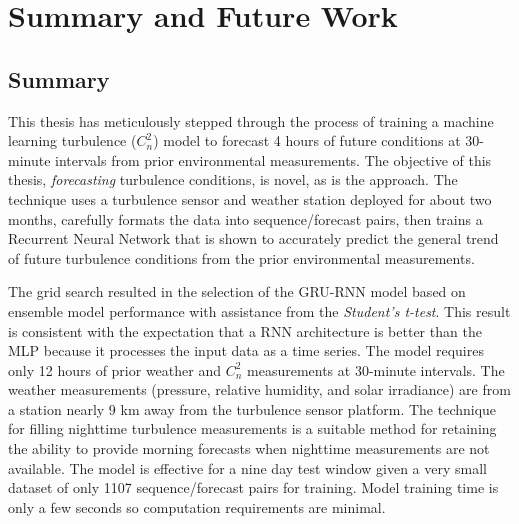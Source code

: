 \chapter{Summary and Future Work}
\label{ch6}

\section{Summary}
This thesis has meticulously stepped through the process of training a machine learning turbulence ($C_{n}^{2}$) model to forecast 4 hours of future conditions at 30-minute intervals from prior environmental measurements. The objective of this thesis, \emph{forecasting} turbulence conditions, is novel, as is the approach. The technique uses a turbulence sensor and weather station deployed for about two months, carefully formats the data into sequence/forecast pairs, then trains a Recurrent Neural Network that is shown to accurately predict the general trend of future turbulence conditions from the prior environmental measurements.

The grid search resulted in the selection of the \ac{GRU-RNN} model based on ensemble model performance with assistance from the \textit{Student's t-test}. This result is consistent with the expectation that a \ac{RNN} architecture is better than the \ac{MLP} because it processes the input data as a time series. The model requires only 12 hours of prior weather and $C_{n}^{2}$ measurements at 30-minute intervals. The weather measurements (pressure, relative humidity, and solar irradiance) are from a station nearly 9 km away from the turbulence sensor platform. The technique for filling nighttime turbulence measurements is a suitable method for retaining the ability to provide morning forecasts when nighttime measurements are not available. The model is effective for a nine day test window given a very small dataset of only 1107 sequence/forecast pairs for training. Model training time is only a few seconds so computation requirements are minimal.

